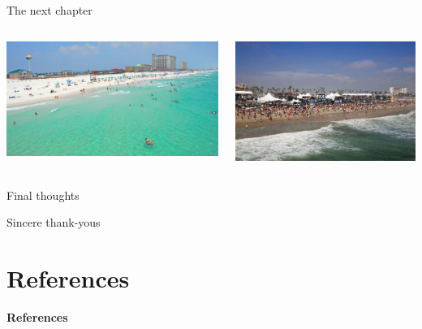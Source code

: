 \documentclass[serif]{beamer}\usepackage[]{graphicx}\usepackage[]{color}
\begin{document}
\begin{frame}{The next chapter}{}
\begin{columns}[t]
\begin{column}{0.5\textwidth}
\includegraphics[width = \textwidth]{fig/pbeach.jpg}
\end{column}
\begin{column}{0.5\textwidth}
\includegraphics[trim= 0cm 0cm 0cm 2.44cm, clip=true,width = \textwidth]{fig/hbeach.jpg}
\end{column}
\end{columns}
\end{frame}

\begin{frame}{Final thoughts}{}

\end{frame}

\begin{frame}{Sincere thank-yous}{}

\end{frame}

\section{References}
\begin{frame}[allowframebreaks,t]{\textbf{References}}
\tiny
{}


\end{frame}
\end{document}
